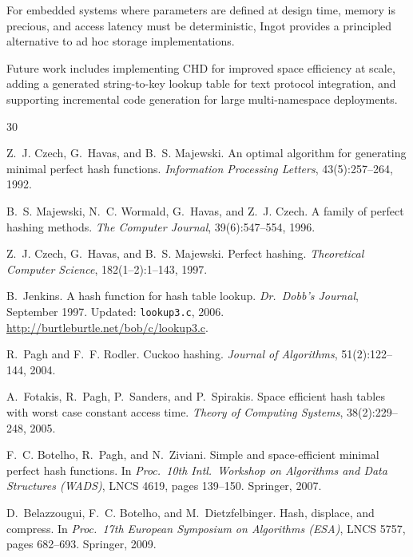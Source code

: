 \documentclass[10pt,twocolumn,letterpaper]{article}
\begin{document}
For embedded systems where parameters are defined at design time,
memory is precious, and access latency must be deterministic, Ingot
provides a principled alternative to ad hoc storage implementations.

Future work includes implementing CHD for improved space efficiency at
scale, adding a generated string-to-key lookup table for text protocol
integration, and supporting incremental code generation for large
multi-namespace deployments.



\begin{thebibliography}{30}

Z.~J. Czech, G.~Havas, and B.~S. Majewski.
\newblock An optimal algorithm for generating minimal perfect hash functions.
\newblock \emph{Information Processing Letters}, 43(5):257--264, 1992.

B.~S. Majewski, N.~C. Wormald, G.~Havas, and Z.~J. Czech.
\newblock A family of perfect hashing methods.
\newblock \emph{The Computer Journal}, 39(6):547--554, 1996.

Z.~J. Czech, G.~Havas, and B.~S. Majewski.
\newblock Perfect hashing.
\newblock \emph{Theoretical Computer Science}, 182(1--2):1--143, 1997.

B.~Jenkins.
\newblock A hash function for hash table lookup.
\newblock \emph{Dr.\ Dobb's Journal}, September 1997.
\newblock Updated: \texttt{lookup3.c}, 2006.
  \url{http://burtleburtle.net/bob/c/lookup3.c}.

R.~Pagh and F.~F. Rodler.
\newblock Cuckoo hashing.
\newblock \emph{Journal of Algorithms}, 51(2):122--144, 2004.

A.~Fotakis, R.~Pagh, P.~Sanders, and P.~Spirakis.
\newblock Space efficient hash tables with worst case constant access time.
\newblock \emph{Theory of Computing Systems}, 38(2):229--248, 2005.

F.~C. Botelho, R.~Pagh, and N.~Ziviani.
\newblock Simple and space-efficient minimal perfect hash functions.
\newblock In \emph{Proc.\ 10th Intl.\ Workshop on Algorithms and Data
  Structures (WADS)}, LNCS 4619, pages 139--150. Springer, 2007.

D.~Belazzougui, F.~C. Botelho, and M.~Dietzfelbinger.
\newblock Hash, displace, and compress.
\newblock In \emph{Proc.\ 17th European Symposium on Algorithms (ESA)},
  LNCS 5757, pages 682--693. Springer, 2009.


\end{thebibliography}
\end{document}
